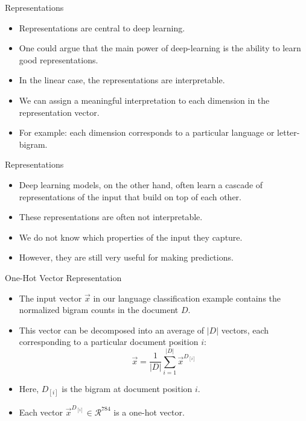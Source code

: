 \documentclass[handout]{beamer}
\begin{document}
\begin{frame}{Representations}

\begin{scriptsize}
\begin{itemize}
\item Representations are central to deep learning.
\item One could argue that the main power of deep-learning is the ability to learn good representations.
\item In the linear case, the representations are interpretable.
\item We can assign a meaningful interpretation to each dimension in the
representation vector.
\item For example: each dimension corresponds to a particular language or letter-bigram.
\end{itemize}
\end{scriptsize}
\end{frame}


\begin{frame}{Representations}

\begin{scriptsize}
\begin{itemize}
\item Deep learning models, on the other hand,  often learn a cascade of representations of the input that build on top of each other. 
\item These representations are often not interpretable.
\item We do not know which properties of the input they capture.
\item However, they are still very useful for making predictions.
\end{itemize}
\end{scriptsize}
\end{frame}

\begin{frame}{One-Hot Vector Representation}

\begin{scriptsize}
\begin{itemize}
\item The input vector $\vec{x}$ in our language classification example contains the normalized bigram counts in the document $D$.
\item This vector can be decomposed into an average of $|D|$ vectors, each corresponding to a particular document position $i$:
\begin{equation}
 \vec{x} = \frac{1}{|D|} \sum_{i=1}^{|D|} \vec{x}^{D_{[i]}}
\end{equation}
\item Here, $D_{[i]}$ is the bigram at document position $i$.
\item Each vector  $\vec{x}^{D_{[i]}} \in \mathcal{R}^{784}$ is a one-hot vector.
\end{itemize}
\end{scriptsize}
\end{frame}
\end{document}

